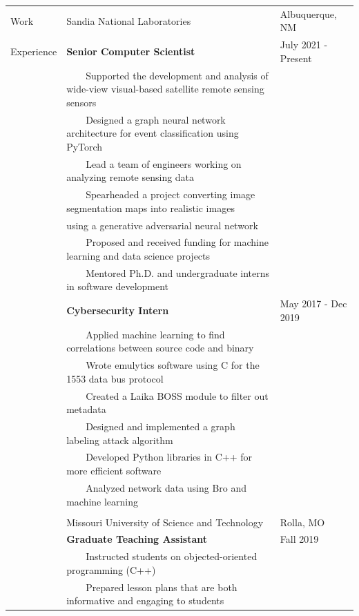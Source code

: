 \documentclass[10pt]{article}
\newcommand{\tabitem}{~~\llap{\textbullet}~~}
\begin{document}
\begin{longtable}{p{1.5cm} p{13.2cm} l}
Work       & Sandia National Laboratories & Albuquerque, NM \\
Experience & \textbf{Senior Computer Scientist} & July 2021 - Present \\
           & \tabitem Supported the development and analysis of wide-view visual-based satellite remote sensing sensors \\
           & \tabitem Designed a graph neural network architecture for event classification using PyTorch \\
           & \tabitem Lead a team of engineers working on analyzing remote sensing data \\
           & \tabitem Spearheaded a project converting image segmentation maps into realistic images \\
           & \hspace{0.4cm} using a generative adversarial neural network \\
           & \tabitem Proposed and received funding for machine learning and data science projects \\
           & \tabitem Mentored Ph.D. and undergraduate interns in software development \\
%
           & \textbf{Cybersecurity Intern} & May 2017 - Dec 2019 \\
           & \tabitem Applied machine learning to find correlations between source code and binary \\
           & \tabitem Wrote emulytics software using C for the 1553 data bus protocol \\
           & \tabitem Created a Laika BOSS module to filter out metadata \\
           & \tabitem Designed and implemented a graph labeling attack algorithm \\
           & \tabitem Developed Python libraries in C++ for more efficient software \\
           & \tabitem Analyzed network data using Bro and machine learning \\ \\
%
           & Missouri University of Science and Technology & Rolla, MO \\
           & \textbf{Graduate Teaching Assistant} & Fall 2019 \\
           & \tabitem Instructed students on objected-oriented programming (C++) \\
           & \tabitem Prepared lesson plans that are both informative and engaging to students \\

\end{longtable}
\end{document}
